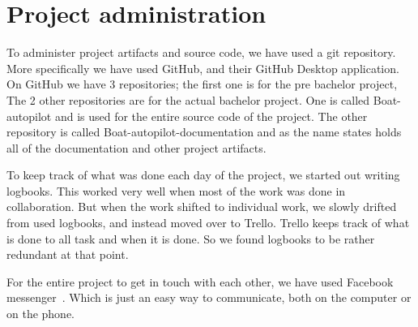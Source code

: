 \chapter{Project administration}
To administer project artifacts and source code, we have used a git repository. More specifically we have used GitHub\cite{github}, and their GitHub Desktop application\cite{github_desktop}. On GitHub we have 3 repositories; the first one is for the pre bachelor project, The 2 other repositories are for the actual bachelor project. One is called Boat-autopilot and is used for the entire source code of the project. The other repository is called Boat-autopilot-documentation and as the name states holds all of the documentation and other project artifacts.

To keep track of what was done each day of the project, we started out writing logbooks. This worked very well when most of the work was done in collaboration. But when the work shifted to individual work, we slowly drifted from used logbooks, and instead moved over to Trello. Trello keeps track of what is done to all task and when it is done. So we found logbooks to be rather redundant at that point. 

For the entire project to get in touch with each other, we have used Facebook messenger~\cite{facebook-messenger}. Which is just an easy way to communicate, both on the computer or on the phone. 

 
%
